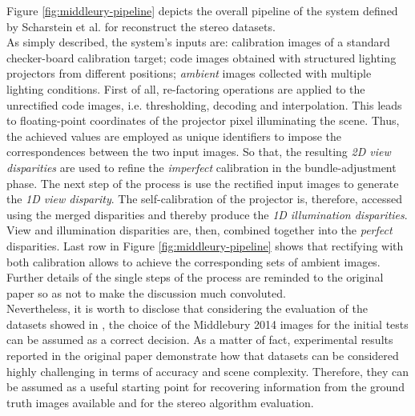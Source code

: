 Figure \ref{fig:middleury-pipeline} depicts the overall pipeline of the system defined by Scharstein et al. \cite{Scharstein2014} for reconstruct the stereo datasets.\\
As simply described, the system's inputs are: calibration images of a standard checker-board calibration target; code images obtained with structured lighting projectors from different positions; \textit{ambient} images collected with multiple lighting conditions. 
First of all, re-factoring operations are applied to the unrectified code images, i.e. thresholding, decoding and interpolation.
This leads to floating-point coordinates of the projector pixel illuminating the scene. 
Thus, the achieved values are employed as unique identifiers to impose the correspondences between the two input images. 
So that, the resulting \textit{2D view disparities} are used to refine the \textit{imperfect} calibration in the bundle-adjustment phase.
The next step of the process is use the rectified input images to generate the \textit{1D view disparity}.
The self-calibration of the projector is, therefore, accessed using the merged disparities and thereby produce the \textit{1D illumination disparities}.
View and illumination disparities are, then, combined together into the \textit{perfect} disparities. 
Last row in Figure \ref{fig:middleury-pipeline} shows that rectifying with both calibration allows to achieve the corresponding sets of ambient images.\\
Further details of the single steps of the process are reminded to the original paper \cite{Scharstein2014} so as not to make the discussion much convoluted.\\
Nevertheless, it is worth to disclose that considering the evaluation of the datasets showed in \cite{Scharstein2014}, the choice of the Middlebury 2014 images for the initial tests can be assumed as a correct decision.
As a matter of fact, experimental results reported in the original paper demonstrate how that datasets can be considered highly challenging in terms of accuracy and scene complexity.
Therefore, they can be assumed as a useful starting point for recovering information from the ground truth images available and for the stereo algorithm evaluation.\\



